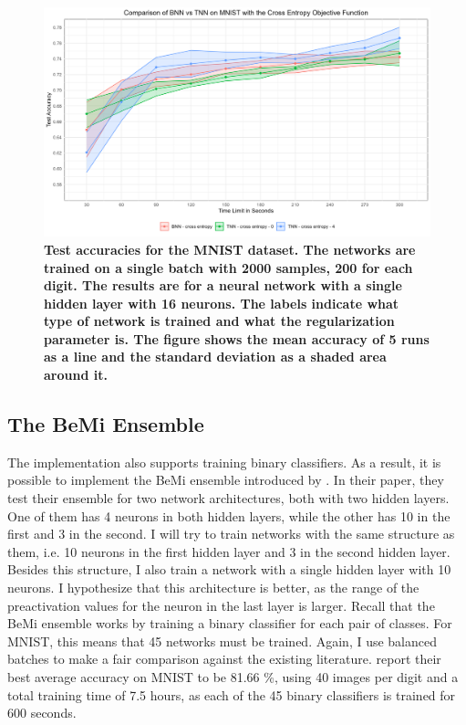 \begin{figure}[H]
    \centering
    \includegraphics[width=1\linewidth]{Figures/BNN_vs_TNN_cs.png}
    \caption{\small{\textbf{Test accuracies for the MNIST dataset. The networks are trained on a single batch with 2000 samples, 200 for each digit. The results are for a neural network with a single hidden layer with 16 neurons. The labels indicate what type of network is trained and what the regularization parameter is. The figure shows the mean accuracy of 5 runs as a line and the standard deviation as a shaded area around it.}}}
    \label{BNN_vs_TNN_cs}
\end{figure}

\subsection{The BeMi Ensemble}
The implementation also supports training binary classifiers. As a result, it is possible to implement the BeMi ensemble introduced by \cite{ambrogio2023}. In their paper, they test their ensemble for two network architectures, both with two hidden layers. One of them has 4 neurons in both hidden layers, while the other has 10 in the first and 3 in the second. I will try to train networks with the same structure as them, i.e. 10 neurons in the first hidden layer and 3 in the second hidden layer. Besides this structure, I also train a network with a single hidden layer with 10 neurons. I hypothesize that this architecture is better, as the range of the preactivation values for the neuron in the last layer is larger. Recall that the BeMi ensemble works by training a binary classifier for each pair of classes. For MNIST, this means that 45 networks must be trained. Again, I use balanced batches to make a fair comparison against the existing literature. \cite{ambrogio2023} report their best average accuracy on MNIST to be 81.66 \%, using 40 images per digit and a total training time of 7.5 hours, as each of the 45 binary classifiers is trained for 600 seconds. \\

